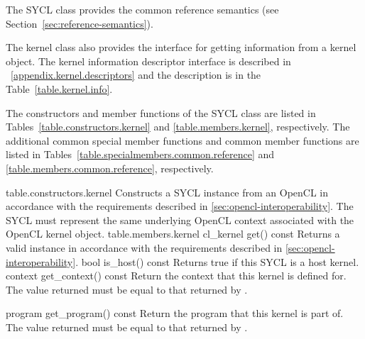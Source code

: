 The SYCL  class provides the common reference semantics
(see Section~\ref{sec:reference-semantics}).

The kernel class also provides the interface for getting information from a
kernel object. The kernel information descriptor interface is described in%
~\ref{appendix.kernel.descriptors} and the description is in the
Table~\ref{table.kernel.info}.

The constructors and member functions of the SYCL  class are listed in Tables~\ref{table.constructors.kernel} and \ref{table.members.kernel}, respectively. The additional common special member functions and common member functions are listed in Tables~\ref{table.specialmembers.common.reference} and \ref{table.members.common.reference}, respectively.



{table.constructors.kernel}
  {
    Constructs a SYCL  instance from an OpenCL  in accordance with the requirements described in \ref{sec:opencl-interoperability}.
    The SYCL  must represent the same underlying OpenCL context associated with the OpenCL kernel object.
  }
\completeTable
{table.members.kernel}
  \addRow
    {cl_kernel get() const}
    {   
      Returns a valid  instance in accordance with the requirements described in \ref{sec:opencl-interoperability}.
     }
  \addRow
  {bool is_host() const}
  {
    Returns true if this SYCL  is a host kernel.
  }
  \addRow
    {context get_context() const}
    {
        Return the context that this kernel is defined for.
        The value returned must be equal to that returned by .
    }

  \addRow
    {program get_program() const}
    {
        Return the program that this kernel is part of.
        The value returned must be equal to that returned by .
    }


